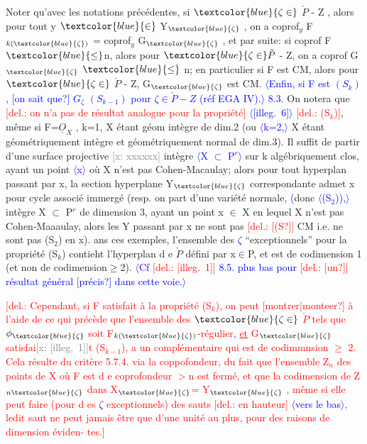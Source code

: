 \documentclass[11pt]{article}
\newcommand{\scanpage}[1]{\par\bigskip\noindent{\small\sffamily[scan #1]}\par}
\newcommand{\mspage}[1]{{\small\sffamily[p.\,#1]}}
\newcommand{\hand}[1]{\textcolor{blue}{#1}}
\let\over\relax
\newcommand{\over}[2]{\textcolor{gray}{#1}\textcolor{blue}{\ensuremath{^{\!\nearrow}}#2}}
\newcommand{\inserted}[2][]{\textcolor{blue}{$\langle$#2$\rangle$}}
\newcommand{\deleted}[1]{\textcolor{red}{[\textsf{del.:} #1]}}
\newcommand{\xout}[1]{\textcolor{gray}{[\textsf{x:} #1]}}
\newcommand{\uline}[1]{\underline{#1}}
\newcommand{\unsure}[1]{[#1?]}
\newcommand{\illegible}[1]{[\textsf{illeg.\ #1}]}
\begin{document}
\mspage{32}

\clearpage
\scanpage{25/33}
\mspage{29}

Noter qu'avec les notations précédentes, si $\hand{\zeta\in}$ $\check{P}$ - Z , alors pour tout
y $\hand{\in}$ Y$_{\hand{\zeta}}$ , on a coprof$_y$ F$_{k(\hand{\zeta})}$ = coprof$_y$ G$_{\hand{\zeta}}$ , et par suite: si coprof F$\hand{\leq}$n,
alors pour $\hand{\zeta\in}\check{P}$ - Z, on a coprof G$_{\hand{\zeta}}$ $\hand{\leq}$ n; en particulier si F est CM, alors
pour $\hand{\zeta\in}$ $\check{P}$ - Z, G$_{\hand{\zeta}}$ est CM. \inserted{Enfin, si F est $(S_k)$, \unsure{on sait que} $G_\zeta$ $(S_{k-1})$ pour $\zeta\in\check{P}-Z$ (réf EGA IV).}
\hand{8.3.} On notera que \deleted{on n'a pas de résultat analogue pour la propriété} \inserted{\illegible{6}}
\deleted{(S$_k$)}, même si F=$\underline{O}_X$ , k=1, X étant géom intègre de dim.2 (ou \inserted{k=2,} X étant
géométriquement intègre et géométriquement normal de dim.3). Il suffit
de partir d'une surface projective \xout{xxxxxx} intègre \inserted[typed]{X $\subset$ P$^r$} sur k algébriquement
clos, ayant un point \inserted[typed]{x} où X n'est pas Cohen-Macaulay; alors pour tout
hyperplan passant par x, la section hyperplane Y$_{\hand{\zeta}}$ correspondante admet
x pour cycle associé immergé (resp. on part d'une variété normale\hand{,} \hand{(}donc
\inserted[typed]{(S$_2$)\hand{)},} intègre X $\subset$ P$^r$ de dimension 3, ayant un point x $\in$ X en lequel X n'est pas
Cohen-Maaaulay, alors les Y passant par x ne sont pas \deleted{\unsure{(S}} CM i.e. ne sont
pas (S$_2$) en x)\hand{.} \over{d}{D}ans ces exemples, l'ensemble des \hand{$\zeta$} ``exceptionnels''
pour la propriété (S$_k$) contieht l'hyperplan d e $\check{P}$ défini par x$\in$P, et est
de codimension 1 (et non de codimension$\geq$2). \inserted{Cf \deleted{\illegible{1}} 8.5. plus bas pour \deleted{\unsure{un}} résultat général \unsure{précis} dans cette voie.}

\deleted{Cependant, si F satisfait à la propriété (S$_k$), on peut \unsure{montrer|monteer} à
l'aide de ce qui précède que l'ensemble des $\hand{\zeta\in}$ $\check{P}$ tels que $\phi_{\hand{\zeta}}$ soit
F$_{k(\hand{\zeta})}$-régulier\hand{,} \uline{et} G$_{\hand{\zeta}}$ satisfai\xout{\illegible{1}}t (S$_{k-1}$), a un complémentaire qui est de
codimmnsion $\geq$ 2. Cela résulte du critère 5.7.4. via la coppofondeur,
du fait que l'ensemble Z$_n$ des points de X où F est d e coprofondeur $>$n est
fermé, et que la codimension de Z$_{n\hand{\zeta}}$ dans X$_{\hand{\zeta}}$= Y$_{\hand{\zeta}}$ , même si elle peut
faire (pour d es \hand{$\zeta$} exceptionnels) des sauts \deleted{en hauteur} \inserted{vers le bas}, ledit saut ne peut
jamais être que d'une unité au plus, pour des raisons de dimension éviden-%
tes.}
\end{document}
